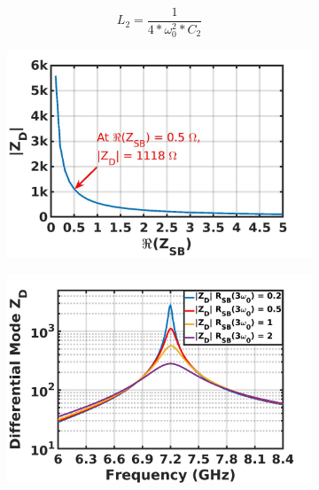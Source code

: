 \documentclass[conference]{IEEEtran}
\begin{document}
\begin{equation}
    L_2=\frac{1}{4*\omega_0^2*C_2}%
    \label{eqn:Design_A_2H}
\end{equation}

\begin{figure}[!t]
\captionsetup{font=footnotesize}
\centering
\begin{subfigure}{0.24\textwidth}
\includegraphics[width=1\textwidth]{Images/Design/Design_A_Zn_3H.jpg}
\caption{}
\label{fig:Design_A_Zn_3H}
\end{subfigure}
\begin{subfigure}{0.24\textwidth}
\includegraphics[width=1\textwidth]{Images/Design/Design_A_Rn_var_3H.jpg}
\caption{}
\label{fig:Design_A_Rn_var_3H}
\end{subfigure}
\begin{subfigure}{0.4\textwidth}

\end{subfigure}
\end{figure}
\end{document}
